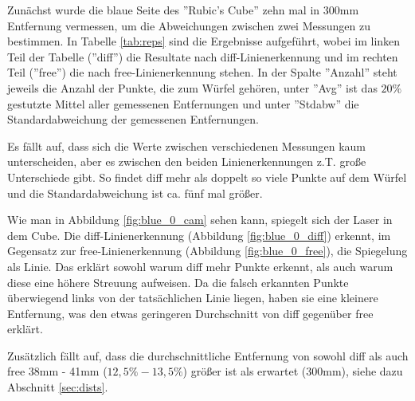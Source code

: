 \documentclass[ngerman,a4paper,parskip=half]{scrartcl}
\begin{document}
Zunächst wurde die blaue Seite des ''Rubic's Cube'' zehn mal in 300mm Entfernung vermessen, um die Abweichungen zwischen zwei Messungen zu bestimmen. In Tabelle \ref{tab:reps} sind die Ergebnisse aufgeführt, wobei im linken Teil der Tabelle (''diff'') die Resultate nach diff-Linienerkennung und im rechten Teil (''free'') die nach free-Linienerkennung stehen. In der Spalte ''Anzahl'' steht jeweils die Anzahl der Punkte, die zum Würfel gehören, unter ''Avg'' ist das $20 \%$ gestutzte Mittel aller gemessenen Entfernungen und unter ''Stdabw'' die Standardabweichung der gemessenen Entfernungen.

Es fällt auf, dass sich die Werte zwischen verschiedenen Messungen kaum unterscheiden, aber es zwischen den beiden Linienerkennungen z.T. große Unterschiede gibt. So findet diff mehr als doppelt so viele Punkte auf dem Würfel und die Standardabweichung ist ca. fünf mal größer.

Wie man in Abbildung \ref{fig:blue_0_cam} sehen kann, spiegelt sich der Laser in dem Cube. Die diff-Linienerkennung (Abbildung \ref{fig:blue_0_diff}) erkennt, im Gegensatz zur free-Linienerkennung (Abbildung \ref{fig:blue_0_free}), die Spiegelung als Linie. Das erklärt sowohl warum diff mehr Punkte erkennt, als auch warum diese eine höhere Streuung aufweisen. Da die falsch erkannten Punkte überwiegend links von der tatsächlichen Linie liegen, haben sie eine kleinere Entfernung, was den etwas geringeren Durchschnitt von diff gegenüber free erklärt.

Zusätzlich fällt auf, dass die durchschnittliche Entfernung von sowohl diff als auch free 38mm - 41mm ($12,5\%-13,5\%$) größer ist als erwartet (300mm), siehe dazu Abschnitt \ref{sec:dists}.
\end{document}

